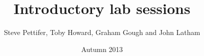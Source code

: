 \documentclass[11pt, a4paper]{report}
\title{Introductory lab sessions}
\date{Autumn 2013}
\author{Steve Pettifer, Toby Howard, Graham Gough and John Latham}
\begin{document}


\setcounter{chapter}{-1}
\renewcommand{\chaptername}{Welcome Lab Session}

\renewcommand{\chaptername}{Intro Lab Session}





\printbibliography
\end{document}
